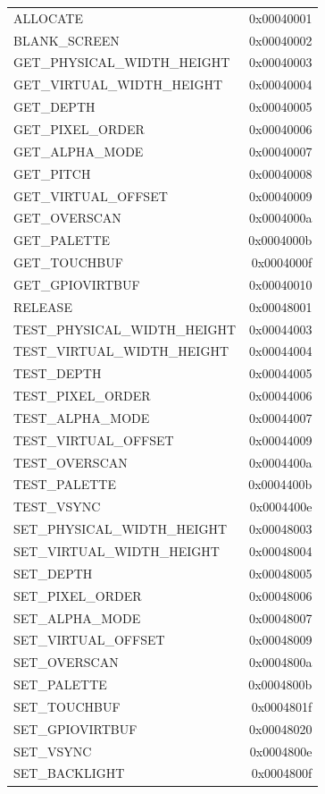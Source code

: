 \documentclass[12pt, svgnames]{book}
\begin{document}
\begin{centering}
{\begin{longtable}{|l | r |}
		 ALLOCATE &                   0x00040001\\
		 BLANK\_SCREEN &               0x00040002\\
		 GET\_PHYSICAL\_WIDTH\_HEIGHT &  0x00040003\\
		 GET\_VIRTUAL\_WIDTH\_HEIGHT &   0x00040004\\
		 GET\_DEPTH &                  0x00040005\\
		 GET\_PIXEL\_ORDER &            0x00040006\\
		 GET\_ALPHA\_MODE &             0x00040007\\
		 GET\_PITCH &                  0x00040008\\
		 GET\_VIRTUAL\_OFFSET &         0x00040009\\
		 GET\_OVERSCAN &               0x0004000a\\
		 GET\_PALETTE &                0x0004000b\\
		 GET\_TOUCHBUF &               0x0004000f\\
		 GET\_GPIOVIRTBUF &            0x00040010\\
		 RELEASE &                    0x00048001\\
		 TEST\_PHYSICAL\_WIDTH\_HEIGHT & 0x00044003\\
		 TEST\_VIRTUAL\_WIDTH\_HEIGHT &  0x00044004\\
		 TEST\_DEPTH &                 0x00044005\\
		 TEST\_PIXEL\_ORDER &           0x00044006\\
		 TEST\_ALPHA\_MODE &            0x00044007\\
		 TEST\_VIRTUAL\_OFFSET &        0x00044009\\
		 TEST\_OVERSCAN &              0x0004400a\\
		 TEST\_PALETTE &               0x0004400b\\
		 TEST\_VSYNC &                 0x0004400e\\
		 SET\_PHYSICAL\_WIDTH\_HEIGHT &  0x00048003\\
		 SET\_VIRTUAL\_WIDTH\_HEIGHT &   0x00048004\\
		 SET\_DEPTH &                  0x00048005\\
		 SET\_PIXEL\_ORDER &            0x00048006\\
		 SET\_ALPHA\_MODE &             0x00048007\\
		 SET\_VIRTUAL\_OFFSET &         0x00048009\\
		 SET\_OVERSCAN &               0x0004800a\\
		 SET\_PALETTE &                0x0004800b\\
		 SET\_TOUCHBUF &               0x0004801f\\
		 SET\_GPIOVIRTBUF &            0x00048020\\
		 SET\_VSYNC &                  0x0004800e\\
		 SET\_BACKLIGHT &              0x0004800f\\
		 

\end{longtable}}
\end{centering}
\end{document}
